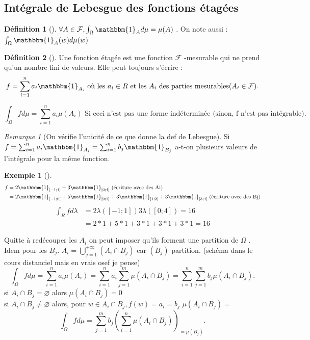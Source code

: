 \documentclass{article}
\theoremstyle{plain}%
\theoremstyle{definition}
\newtheorem{defn}{Définition}[section]
\newtheorem{exmp}{Exemple}[section]
\theoremstyle{remark}
\newtheorem*{rem}{Remarque}
\begin{document}
\subsection{Intégrale de Lebesgue des fonctions étagées}
\begin{defn}[]
    $ \forall A \in \mathcal{F}, \int_{\Omega }^{}\mathbbm{1}_{A}d \mu = \mu (A) $ . On note aussi : $ \int_{\Omega }^{}\mathbbm{1}_{A}(w) d \mu (w) $ 
\end{defn}
\begin{defn}[]
    Une fonction étagée est une fonction $ \mathcal{F} $ -mesurable qui ne prend qu'un nombre fini de valeurs. Elle peut toujours s'écrire : 
    \[
        f = \sum_{i=1}^{n}a_i \mathbbm{1}_{A_i} \text{ où les } a_i \in R \text{ et les } A_i \text{ des parties mesurables} (A_i \in \mathcal{F})
    .\]
    
    \[
        \int_{\Omega }^{}f d \mu = \sum_{i=1}^{n}a_i \mu (A_i) \text{ Si ceci n'est pas une forme indéterminée (sinon, f n'est pas intégrable)}
    .\]
\end{defn}
\begin{rem}[On vérifie l'unicité de ce que donne la def de Lebesgue]
    Si $ f = \sum_{i=1}^{n}a_i \mathbbm{1}_{A_i}= \sum_{i=1}^{n} b_j \mathbbm{1}_{B_j} $ a-t-on plusieurs valeurs de l'intégrale pour la même fonction.
    \begin{exmp}[]
        \begin{align*}
            f &= 2 \mathbbm{1}_{[-1;1]} + 3 \mathbbm{1}_{[0;4]} \text{ (écriture avec des Ai)}\\
                &= 2 \mathbbm{1}_{[-1; 0[} + 5 \mathbbm{1}_{[0;1]} + 3 \mathbbm{1}_{]1;2[} + 3 \mathbbm{1}_{[3;4]} \text{ (écriture avec des Bj)}
        \end{align*}
        \begin{align*}
            \int_{R}^{}fd \lambda &= 2 \lambda ([-1;1]) 3 \lambda ([0;4]) = 16 \\
                                &= 2*1+5*1+3*1+3*1+3*1 = 16
        \end{align*}
    \end{exmp}
    Quitte à redécouper les $ A_i $ on peut imposer qu'ils forment une partition de $ \Omega  $ . Idem pour les $ B_j $. $ A_i = \bigcup_{j=1}^{+\infty } (A_i \cap B_j) $ car $ (B_j) $ partition. (schéma dans le cours distanciel mais en vrais osef je pense)
    \[
        \int_{\Omega }^{}f d \mu = \sum_{i=1}^{n}a_i \mu (A_i) = \sum_{i=1}^{n}a_i \sum_{j=1}^{m}\mu (A_i \cap B_j) = \sum_{i=1}^{n}\sum_{j=1}^{m} b_j \mu (A_i \cap B_j)
    .\]
    si $ A_i \cap B_j = \varnothing  $ alors $ \mu (A_i \cap B_j) = 0$ \\
    si $ A_i \cap B_j \neq  \varnothing  $ alors, pour $ w \in A_i \cap B_j, f(w) = a_i = b_j$  $ \mu (A_i \cap B_j) = $ \\
    
    \[
        \int_{\Omega }^{}fd \mu = \sum_{j=1}^{m}b_j (\sum_{i=1}^{n}\mu (A_i \cap B_j))_{=\mu (B_j)}
    .\]
\end{rem}
\end{document}
